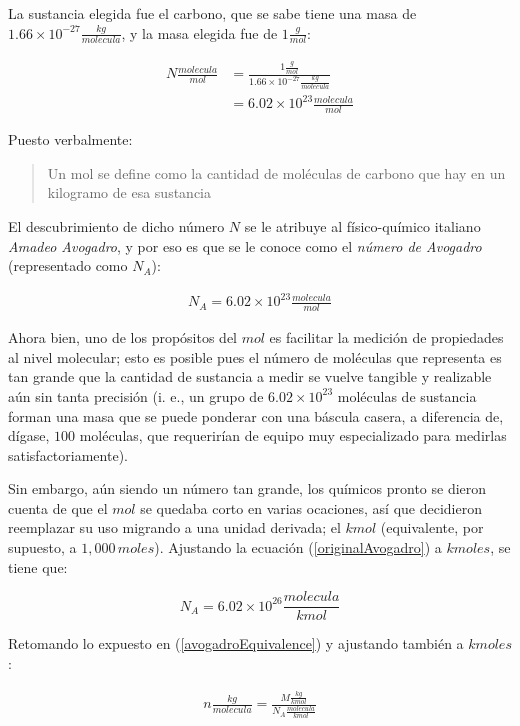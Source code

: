 \documentclass{article}
\begin{document}
La sustancia elegida fue el carbono, que se sabe tiene una masa de \(1.66\times10^{-27}\frac{kg}{molecula}\),
y la masa elegida fue de \(1\frac{g}{mol}\):

\begin{align*}
    N\frac{molecula}{mol} & = \frac{1\frac{g}{mol}}{1.66 \times 10^{-27}\frac{kg}{molecula}} \\
                          & = 6.02 \times 10^{23} \frac{molecula}{mol}
\end{align*}

Puesto verbalmente:

\begin{quote}
    Un mol se define como la cantidad de moléculas
    de carbono que hay en un kilogramo de esa sustancia
\end{quote}

El descubrimiento de dicho número \(N\) se le atribuye al físico-químico
italiano \textit{Amadeo Avogadro}, y por eso es que se le conoce
como el \textit{número de Avogadro} (representado como \(N_A\)):

\begin{align}
    N_A = 6.02 \times 10^{23} \frac{molecula}{mol} \label{originalAvogadro}
\end{align}

Ahora bien, uno de los propósitos del \(mol\) es facilitar
la medición de propiedades al nivel molecular; esto es
posible pues el número de moléculas que representa es tan grande
que la cantidad de sustancia a medir se vuelve tangible y
realizable aún sin tanta precisión (i. e., un grupo de
\(6.02 \times 10^{23}\) moléculas de sustancia forman una masa
que se puede ponderar con una báscula casera, a diferencia de, dígase,
\(100\) moléculas, que requerirían de equipo muy especializado
para medirlas satisfactoriamente).

Sin embargo, aún siendo un número tan grande, los químicos
pronto se dieron cuenta de que el \(mol\) se quedaba
corto en varias ocaciones, así que decidieron reemplazar su uso migrando
a una unidad derivada; el \(kmol\) (equivalente, por supuesto,
a \(1,000\,moles\)). Ajustando la ecuación (\ref{originalAvogadro}) a \(kmoles\),
se tiene que:

\[
    N_A = 6.02 \times 10^{26} \frac{molecula}{kmol}
\]

Retomando lo expuesto en (\ref{avogadroEquivalence}) y ajustando también a \(kmoles\):

\begin{align}
    n \frac{kg}{molecula} = \frac{M \frac{kg}{kmol}}{ N_A \frac{molecula}{kmol}}
\end{align}
\end{document}
